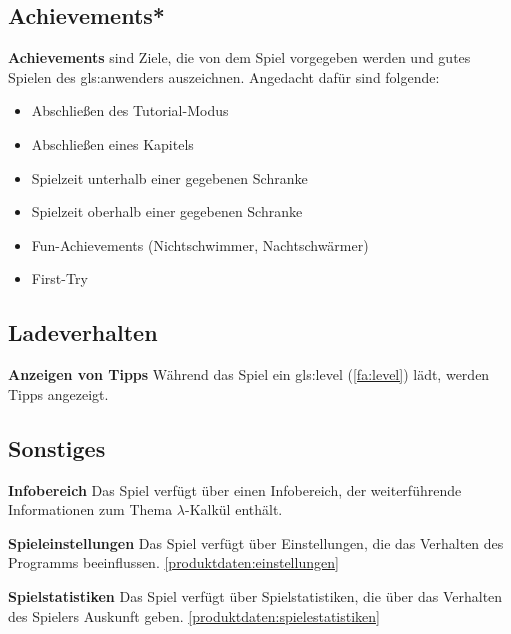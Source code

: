 \documentclass{scrartcl}
\begin{document}
\subsection{Achievements*}

\begin{falist}[resume]
    \item \label{fa:achievements} \textbf{Achievements} sind Ziele, die von dem Spiel vorgegeben werden und gutes Spielen des \gls{gls:anwender}s auszeichnen. Angedacht dafür sind folgende:
    \begin{itemize}
    	\item Abschließen des Tutorial-Modus
    	\item Abschließen eines Kapitels
    	\item Spielzeit unterhalb einer gegebenen Schranke
    	\item Spielzeit oberhalb einer gegebenen Schranke
    	\item Fun-Achievements (Nichtschwimmer, Nachtschwärmer)
    	\item First-Try
    \end{itemize}
\end{falist}

\subsection{Ladeverhalten}

\begin{falist}[resume]
	\item \label{fa:tipps} \textbf{Anzeigen von Tipps} Während das Spiel ein \gls{gls:level} (\ref{fa:level}) lädt, werden Tipps angezeigt.
\end{falist}

\subsection{Sonstiges}

\begin{falist}[resume]
	\item \label{fa:infobereich} \textbf{Infobereich} Das Spiel verfügt über einen Infobereich, der weiterführende Informationen zum Thema $\lambda$-Kalkül enthält.
	\item \label{fa:spieleinstellungen} \textbf{Spieleinstellungen} Das Spiel verfügt über Einstellungen, die das Verhalten des Programms beeinflussen. \ref{produktdaten:einstellungen}
	\item \label{fa:spielestatistiken} \textbf{Spielstatistiken} Das Spiel verfügt über Spielstatistiken, die über das Verhalten des Spielers Auskunft geben. \ref{produktdaten:spielestatistiken}
	
\end{falist}
\end{document}
